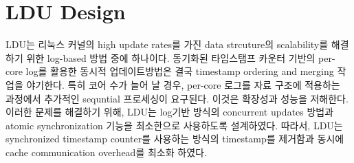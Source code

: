 \section{LDU Design}


\ifkor
LDU는 리눅스 커널의 high update rates를 가진 data strcuture의 scalability를
해결하기 위한 log-based 방법 중에 하나이다.
동기화된 타임스탬프 카운터 기반의 per-core log를 활용한 동시적 업데이트방법은 결국 timestamp ordering and
merging 작업을 야기한다.
특히 코어 수가 늘어 날 경우, per-core 로그를 자료 구조에 적용하는 과정에서 추가적인 sequntial 프로세싱이 요구된다.
이것은 확장성과 성능을 저해한다. 
이러한 문제를 해결하기 위해, LDU는 log기반 방식의 concurrent updates 방법과 atomic synchronization
기능을 최소한으로 사용하도록 설계하였다.
따라서, LDU는 synchronized timestamp counter를 사용하는 방식의 timestamp를 제거함과 동시에 cache
communication overhead를 최소화 하였다.
\else












